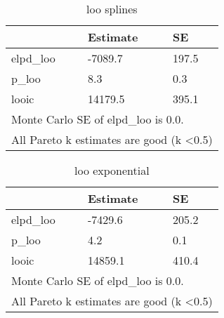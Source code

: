 \documentclass[
  twocolumn]{article}
\begin{document}
\begin{table}[h!]
\begin{center}
\begin{tabular}{|lll|}
\hline
\multicolumn{1}{|l|}{}          & \multicolumn{1}{l|}{Estimate} & SE    \\ \hline
\multicolumn{1}{|l|}{elpd\_loo} & \multicolumn{1}{l|}{-7089.7}  & 197.5 \\ \hline
\multicolumn{1}{|l|}{p\_loo}    & \multicolumn{1}{l|}{8.3}      & 0.3   \\ \hline
\multicolumn{1}{|l|}{looic}     & \multicolumn{1}{l|}{14179.5}  & 395.1 \\ \hline
\multicolumn{3}{|l|}{Monte Carlo SE of elpd\_loo is 0.0.}               \\ \hline
\multicolumn{3}{|l|}{All Pareto k estimates are good (k \textless 0.5)} \\ \hline
\end{tabular}
\caption{loo splines}
\end{center}
\end{table}

\begin{table}[h!]
\begin{center}
\begin{tabular}{|lll|}
\hline
\multicolumn{1}{|l|}{}          & \multicolumn{1}{l|}{Estimate} & SE    \\ \hline
\multicolumn{1}{|l|}{elpd\_loo} & \multicolumn{1}{l|}{-7429.6}  & 205.2 \\ \hline
\multicolumn{1}{|l|}{p\_loo}    & \multicolumn{1}{l|}{4.2}      & 0.1   \\ \hline
\multicolumn{1}{|l|}{looic}     & \multicolumn{1}{l|}{14859.1}  & 410.4 \\ \hline
\multicolumn{3}{|l|}{Monte Carlo SE of elpd\_loo is 0.0.}               \\ \hline
\multicolumn{3}{|l|}{All Pareto k estimates are good (k \textless 0.5)} \\ \hline
\end{tabular}
\caption{loo exponential}
\end{center}
\end{table}
\end{document}
